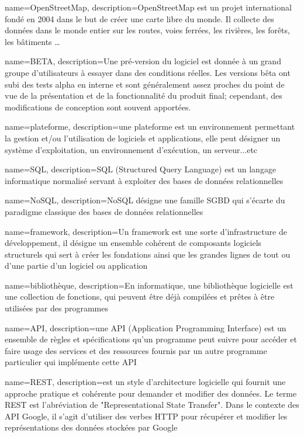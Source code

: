 {
    name=OpenStreetMap,
    description={OpenStreetMap est un projet international fondé en 2004 dans le but de créer une carte libre du monde. Il collecte des données dans le monde entier sur les routes, voies ferrées, les rivières, les forêts, les bâtiments …}
}

{
	name=BETA,
	description={Une pré-version du logiciel est donnée à un grand groupe d’utilisateurs à essayer dans des conditions réelles. Les versions bêta ont subi des tests alpha en interne et sont généralement assez proches du point de vue de la présentation et de la fonctionnalité du produit final; cependant, des modifications de conception sont souvent apportées.\cite{noauthor_beta_nodate}}
}

{
    name=plateforme,
    description={une plateforme est un environnement permettant la gestion et/ou l'utilisation de logiciels et applications, elle peut désigner un système d'exploitation, un environnement d'exécution, un serveur...etc}
}

{
    name=SQL,
    description={SQL (Structured Query Language) est un langage informatique normalisé servant à exploiter des bases de données relationnelles}
}

{
    name=NoSQL,
    description={NoSQL désigne une famille SGBD qui s'écarte du paradigme classique des bases de données relationnelles}
}

{
    name=framework,
    description={Un framework est une sorte d'infrastructure de développement, il désigne un ensemble cohérent de composants logiciels structurels qui sert à créer les fondations ainsi que les grandes lignes de tout ou d'une partie d'un logiciel ou application}
}

{
    name=bibliothèque,
    description={En informatique, une bibliothèque logicielle est une collection de fonctions, qui peuvent être déjà compilées et prêtes à être utilisées par des programmes}
}

{
    name=API,
    description={une API (Application Programming Interface) est un ensemble de règles et spécifications qu'un programme peut suivre pour accéder et faire usage des services et des ressources fournis par un autre programme particulier qui implémente cette API}
}

{
    name=REST,
    description={est un style d'architecture logicielle qui fournit une approche pratique et cohérente pour demander et modifier des données.
Le terme REST est l'abréviation de "Representational State Transfer". Dans le contexte des API Google, il s’agit d’utiliser des verbes HTTP pour récupérer et modifier les représentations des données stockées par Google}
}